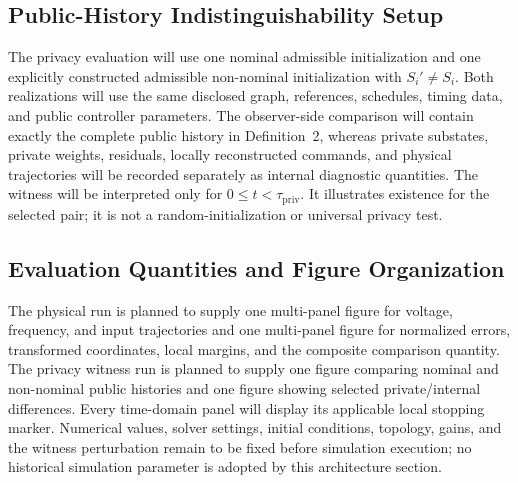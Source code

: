 \documentclass[journal]{IEEEtran}
\begin{document}
\subsection{Public-History Indistinguishability Setup}

The privacy evaluation will use one nominal admissible initialization and one
explicitly constructed admissible non-nominal initialization with
$S_i'\neq S_i$. Both realizations will use the same disclosed graph,
references, schedules, timing data, and public controller parameters. The
observer-side comparison will contain exactly the complete public history in
Definition~2, whereas private substates, private weights, residuals, locally
reconstructed commands, and physical trajectories will be recorded separately
as internal diagnostic quantities. The witness will be interpreted only for
$0\leq t<\tau_{\mathrm{priv}}$. It illustrates existence for the selected
pair; it is not a random-initialization or universal privacy test.

\subsection{Evaluation Quantities and Figure Organization}

The physical run is planned to supply one multi-panel figure for voltage,
frequency, and input trajectories and one multi-panel figure for normalized
errors, transformed coordinates, local margins, and the composite comparison
quantity. The privacy witness run is planned to supply one figure comparing
nominal and non-nominal public histories and one figure showing selected
private/internal differences. Every time-domain panel will display its
applicable local stopping marker. Numerical values, solver settings, initial
conditions, topology, gains, and the witness perturbation remain to be fixed
before simulation execution; no historical simulation parameter is adopted by
this architecture section.

\end{document}
